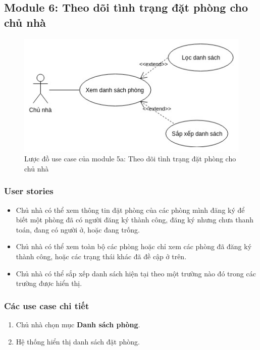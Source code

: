 \subsection{Module 6: Theo dõi tình trạng đặt phòng cho chủ nhà}
\begin{figure}[!h]
	\centering
	\includegraphics[width=\textwidth]{parts/Cuong/images/module5a.jpg}
	\caption{Lược đồ use case của module 5a: Theo dõi tình trạng đặt phòng cho chủ nhà}
\end{figure}

\subsubsection{User stories}
\begin{itemize}
    \item Chủ nhà có thể xem thông tin đặt phòng của các phòng mình đăng ký để biết một phòng đã có người đăng ký thành công, đăng ký nhưng chưa thanh toán, đang có người ở, hoặc đang trống.
    \item Chủ nhà có thể xem toàn bộ các phòng hoặc chỉ xem các phòng đã đăng ký thành công, hoặc các trạng thái khác đã đề cập ở trên.
    \item Chủ nhà có thể sắp xếp danh sách hiện tại theo một trường nào đó trong các trường được hiển thị.
\end{itemize}

\subsubsection{Các use case chi tiết}
\begin{usecase}
	
	\normalflow
	\begin{enumerate}
		\item Chủ nhà chọn mục \textbf{Danh sách phòng}.
        \item Hệ thống hiển thị danh sách đặt phòng.
	\end{enumerate} \\ \hline
	
	\noalternative
	\noexception
\end{usecase}


